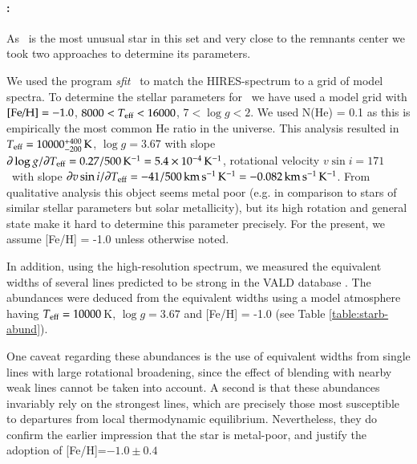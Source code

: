 \paragraph{\starb:} As \starb\ is the most unusual star in this set and very close to the 
remnants center we took two approaches to determine its parameters.  

We used the program \textit{sfit} \citesfit\ to match the HIRES-spectrum to a grid of model spectra. To determine the stellar parameters for \starb\ we have used a model grid with $\textnormal{[Fe/H]} = -1.0$, $8000 < T_{\textnormal{eff}} < 16000$, $7 < \log{g} < 2$. We used N(He) = 0.1 as this is empirically the most common He ratio in the universe. 
This analysis resulted in $T_{\rm eff} = 10000^{+ 400}_{-200}\,\rm{K}$, $\log{g} = 3.67$ with slope  $\partial \log{g}/\partial T_{\rm eff} = 0.27/500 \,\rm{K}^{-1}= 5.4 \times 10^{-4}\, \rm{K}^{-1}$, rotational velocity $v\sin{i} = 171$\,\kms\ with slope $\partial v\sin{i}/\partial T_{\rm eff} = -41/500\,\rm{km\,s^{-1}\,K^{-1}} =  -0.082\,\rm{km\,s^{-1}\,K^{-1}}$. From qualitative analysis this object seems metal poor (e.g. in comparison to stars of similar stellar parameters but solar metallicity), but its high rotation and general state make it hard to determine this parameter precisely. For the present, we assume [Fe/H] = -1.0 unless otherwise noted.

In addition, using the high-resolution spectrum, we measured the equivalent widths of several lines predicted to be strong in the VALD database \citep{2000BaltA...9..590K}. The abundances were deduced from the equivalent widths using a model atmosphere having $T_{\rm eff} = 10000$\,K, $\log{g}=3.67$ and [Fe/H] = -1.0 (see Table \ref{table:starb-abund}).

One caveat regarding these abundances is the use of equivalent widths from 
single lines with large rotational broadening, since the effect of blending 
with nearby weak lines cannot be taken into account. A second is that these 
abundances invariably rely on the strongest lines, which are precisely those 
most susceptible to departures from local thermodynamic equilibrium. 
Nevertheless, they do confirm the earlier impression that the star is 
metal-poor, and justify the adoption of [Fe/H]=$-1.0 \pm 0.4$


%
%
%
%

